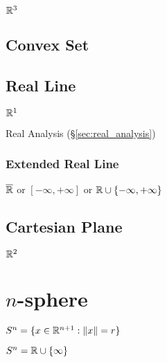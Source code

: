 $\mathbb{R}^3$



\subsection{Convex Set}\label{sec:convex_set}


\subsection{Real Line}\label{sec:real_line}

$\mathbb{R}^1$

\fist Real Analysis (\S\ref{sec:real_analysis})



\subsubsection{Extended Real Line}\label{sec:extended_real_line}

$\overline{\mathbb{R}}$ or $[-\infty, +\infty]$ or $\mathbb{R} \cup \{
-\infty, +\infty\}$




\subsection{Cartesian Plane}\label{sec:cartesian_plane}

$\mathbb{R}^2$



\section{$n$-sphere}\label{sec:n_sphere}

$S^n = \{ x \in \mathbb{R}^{n+1} : \|x\| = r \}$

$S^n = \mathbb{R} \cup \{\infty\}$

